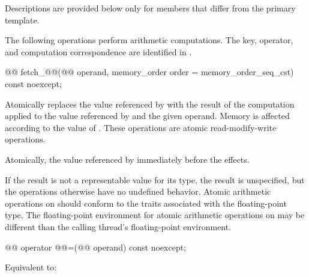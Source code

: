 \pnum
Descriptions are provided below only for members
that differ from the primary template.

\pnum
The following operations perform arithmetic computations.
The key, operator, and computation correspondence are identified
in .

%
%
\begin{itemdecl}
@@ fetch_@@(@@ operand,
                          memory_order order = memory_order_seq_cst) const noexcept;
\end{itemdecl}

\begin{itemdescr}
\pnum
\effects Atomically replaces the value referenced by  with
the result of the computation applied to the value referenced by 
and the given operand.
Memory is affected according to the value of .
These operations are atomic read-modify-write operations.

\pnum
\returns Atomically, the value referenced by 
immediately before the effects.

\pnum
\remarks If the result is not a representable value for its type,
the result is unspecified,
but the operations otherwise have no undefined behavior.
Atomic arithmetic operations on  should conform to
the  traits
associated with the floating-point type.
The floating-point environment
for atomic arithmetic operations on 
may be different than the calling thread's floating-point environment.
\end{itemdescr}

%
%
\begin{itemdecl}
@@ operator @@=(@@ operand) const noexcept;
\end{itemdecl}

\begin{itemdescr}
\effects Equivalent to:
\end{itemdescr}

